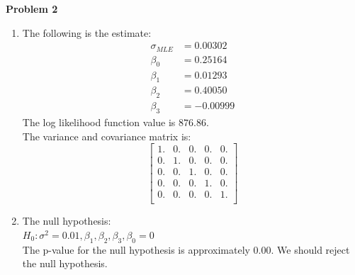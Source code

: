 \documentclass[letterpaper,12pt]{article}
\theoremstyle{definition}
\numberwithin{equation}{section}
\begin{document}
\noindent \textbf{\large Problem 2}\par

\begin{enumerate} [\bfseries (a)]
\item The following is the estimate:
\begin{align*}
\sigma_{MLE} &= 0.00302\\
\beta_0 &= 0.25164\\
\beta_1 &= 0.01293\\
\beta_2 &= 0.40050\\
\beta_3 &= -0.00999
\end{align*}
The log likelihood function value is \(876.86\).\\
The variance and covariance matrix is:\\
\[
\begin{bmatrix}

 1.&  0.&  0.&  0.&  0.\\
 0.&  1.&  0.&  0. & 0.\\
 0.&  0.&  1.&  0.&  0.\\
 0.&  0.&  0.&  1.&  0.\\
 0.&  0.&  0.&  0.&  1.\\
\end{bmatrix}
\]
\item
The null hypothesis:\\
\(H_0: \sigma^2 = 0.01, \beta_1, \beta_2, \beta_3, \beta_0 = 0\)\\
The p-value for the null hypothesis is approximately 0.00. We should reject the null hypothesis.

\end{enumerate}
\end{document}
